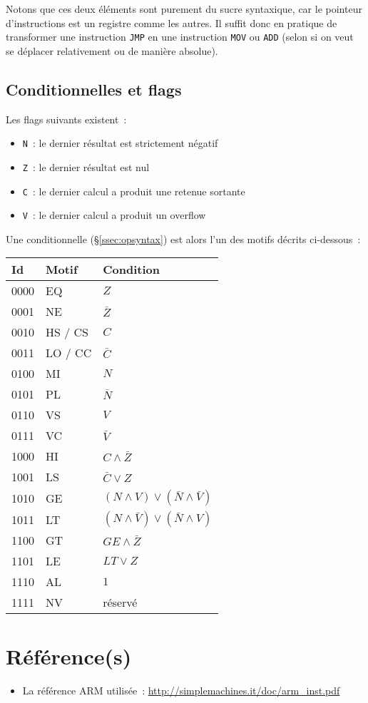 \documentclass[11pt,a4paper]{article}
\begin{document}
Notons que ces deux éléments sont purement du sucre syntaxique, car le pointeur d'instructions est un registre comme les autres. Il suffit donc en pratique de transformer une instruction \texttt{JMP} en une instruction \texttt{MOV} ou \texttt{ADD} (selon si on veut se déplacer relativement ou de manière absolue).

\subsection{Conditionnelles et flags}

Les flags suivants existent~:

\begin{itemize}
\item \texttt{N}~: le dernier résultat est strictement négatif
\item \texttt{Z}~: le dernier résultat est nul
\item \texttt{C}~: le dernier calcul a produit une retenue sortante
\item \texttt{V}~: le dernier calcul a produit un overflow
\end{itemize}

Une conditionnelle (§\ref{ssec:opsyntax}) est alors l'un des motifs décrits ci-dessous~:

\begin{center}
\begin{tabular}{l|l|l}
\textbf{Id} & \textbf{Motif} & \textbf{Condition}\\
\hline\hline
0000 & EQ & $Z$ \\
0001 & NE & $\bar{Z}$ \\
0010 & HS / CS & $C$ \\
0011 & LO / CC & $\bar{C}$ \\
0100 & MI & $N$ \\
0101 & PL & $\bar{N}$ \\
0110 & VS & $V$ \\
0111 & VC & $\bar{V}$ \\
1000 & HI & $C \wedge \bar{Z}$ \\
1001 & LS & $\bar{C} \vee Z$ \\
1010 & GE & $(N \wedge V) \vee (\bar{N} \wedge \bar{V})$ \\
1011 & LT & $(N \wedge \bar{V}) \vee (\bar{N} \wedge V)$ \\
1100 & GT & $GE \wedge \bar{Z}$ \\
1101 & LE & $LT \vee Z$ \\
1110 & AL & $1$ \\
1111 & NV & réservé \\
\end{tabular}
\end{center}

\section*{Référence(s)}

\begin{itemize}
\item La référence ARM utilisée~: \url{http://simplemachines.it/doc/arm_inst.pdf}
\end{itemize}
\end{document}
